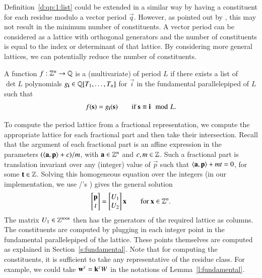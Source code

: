 Definition~\ref{d:qp:1:list} could be extended in a similar way
by having a constituent for each residue modulo a vector period $\vec q$.
However, as pointed out by , this may not result
in the minimum number of constituents.
A vector period can be considered as a lattice with orthogonal generators and
the number of constituents is equal to the index or determinant of that lattice.
By considering more general lattices, we can potentially reduce the number
of constituents.
\begin{definition}
\label{d:qp}
A function $f : \mathbb{Z}^n \to \mathbb{Q}$ is
a (multivariate)  of period $L$ if there
exists a list of $\det L$ polynomials $g_{\vec i} \in \QQ[T_1,\ldots,T_n]$
for $\vec i$ in the fundamental parallelepiped of $L$ such
that
\[
f (\vec s) = g_{\vec i}(\vec s) \qquad \hbox{if $\vec s \equiv \vec i \mod L$}
.
\]
\end{definition}

To compute the period lattice from a fractional representation, we compute
the appropriate lattice for each fractional part and then take their intersection.
Recall that the argument of each fractional part is an affine expression
in the parameters $(\sp a p + c)/m$,
with $\vec a \in \ZZ^n$ and $c, m \in \mathbb{Z}$.
Such a fractional part is translation invariant over
any (integer) value of $\vec p$
such that $\sp a p + m t = 0$, for some $\vec t \in \ZZ$.
Solving this homogeneous equation over the integers (in our implementation,
we use \PolyLib/'s ) gives the general solution
$$
\begin{bmatrix}
\vec p \\ t
\end{bmatrix}
=
\begin{bmatrix}
U_1 \\ U_2
\end{bmatrix}
\vec x
\qquad\text{for $\vec x \in \ZZ^n$}
.
$$
The matrix $U_1 \in \mathbb{Z}^{n \times n}$ then has the generators of
the required lattice as columns.
The constituents are computed by plugging in each integer point
in the fundamental parallelepiped of the lattice.
These points themselves are computed as explained in Section~\ref{s:fundamental}.
Note that for computing the constituents, it is sufficient to take any
representative of the residue class.  For example, we could take
$\vec w^\T = \vec k^\T W$ in the notations of Lemma~\ref{l:fundamental}.

